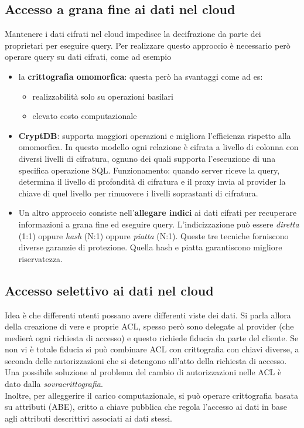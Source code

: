 \subsection{Accesso a grana fine ai dati nel cloud}
Mantenere i dati cifrati nel cloud impedisce la decifrazione da parte dei proprietari per eseguire query. Per realizzare questo approccio è necessario però operare query su dati cifrati, come ad esempio
\begin{itemize}
    \item la \textbf{crittografia omomorfica}: questa però ha svantaggi come ad es:
        \begin{itemize}
            \item realizzabilità solo su operazioni basilari
            \item elevato costo computazionale
        \end{itemize}
    \item \textbf{CryptDB}: supporta maggiori operazioni e migliora l'efficienza rispetto alla omomorfica. In questo modello ogni relazione è cifrata a livello di colonna con diversi livelli di cifratura, ognuno dei quali supporta l'esecuzione di una specifica operazione SQL.
    Funzionamento: quando server riceve la query, determina il livello di profondità di cifratura e il proxy invia al provider la chiave di quel livello per rimuovere i livelli soprastanti di cifratura.
    \item Un altro approccio consiste nell'\textbf{allegare indici} ai dati cifrati per recuperare informazioni a grana fine ed eseguire query. L'indicizzazione può essere \textit{diretta} (1:1) oppure \textit{hash} (N:1) oppure \textit{piatta} (N:1). Queste tre tecniche forniscono diverse garanzie di protezione. Quella hash e piatta garantiscono migliore riservatezza.
\end{itemize}

\subsection{Accesso selettivo ai dati nel cloud}
Idea è che differenti utenti possano avere differenti viste dei dati. Si parla allora della creazione di vere e proprie ACL, spesso però sono delegate al provider (che medierà ogni richiesta di accesso) e questo richiede fiducia da parte del cliente. Se non vi è totale fiducia si può combinare ACL con crittografia con chiavi diverse, a seconda delle autorizzazioni che si detengono all'atto della richiesta di accesso.
Una possibile soluzione al problema del cambio di autorizzazioni nelle ACL è dato dalla \textit{sovracrittografia}.\\
Inoltre, per alleggerire il carico computazionale, si può operare crittografia basata su attributi (ABE), critto a chiave pubblica che regola l'accesso ai dati in base agli attributi descrittivi associati ai dati stessi.
